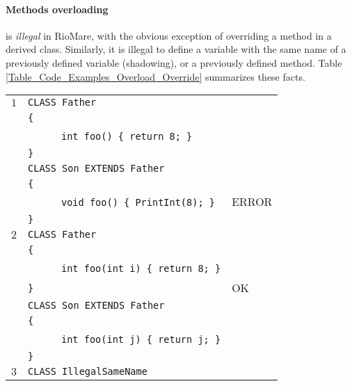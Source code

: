 \documentclass{article}
\begin{document}
\paragraph{Methods overloading} is \textit{illegal} in RioMare,
with the obvious exception of overriding a method in a derived class.
Similarly, it is illegal to define a variable with the same name of
a previously defined variable (shadowing), or a previously defined method.
Table \ref{Table_Code_Examples_Overload_Override} summarizes these facts.
\begin{table}[h]
\centering
\begin{tabular}{|l|l|l|}
\hline
 $1$ & \verb"CLASS Father"                       &       \\
     & \verb"{"                                  &       \\
     & ~ ~ ~ ~\verb"int foo() { return 8; }"     &       \\
     & \verb"}"                                  &       \\
     & \verb"CLASS Son EXTENDS Father"           &       \\
     & \verb"{"                                  &       \\
     & ~ ~ ~ ~\verb"void foo() { PrintInt(8); }" & ERROR \\
     & \verb"}"                                  &       \\
\hline
 $2$ & \verb"CLASS Father"                        &    \\
     & \verb"{"                                   &    \\
     & ~ ~ ~ ~\verb"int foo(int i) { return 8; }" &    \\
     & \verb"}"                                   & OK \\
     & \verb"CLASS Son EXTENDS Father"            &    \\
     & \verb"{"                                   &    \\
     & ~ ~ ~ ~\verb"int foo(int j) { return j; }" &    \\
     & \verb"}"                                   &    \\
\hline
 $3$ & \verb"CLASS IllegalSameName"                   &       \\

\end{tabular}
\end{table}
\end{document}
